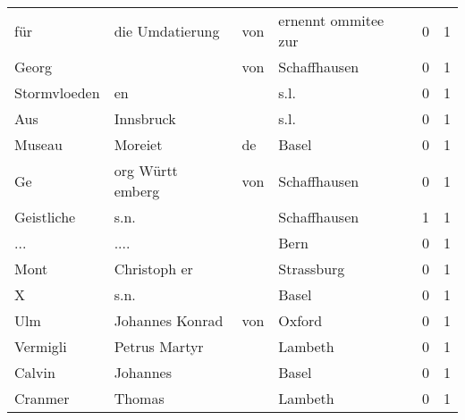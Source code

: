 \begin{center}
\begin{tiny}
\begin{longtabu}{llllrr}
                      für &                    die Umdatierung &         von &                         ernennt ommitee zur &          0 &         1 \\
                    Georg &                                    &         von &                                Schaffhausen &          0 &         1 \\
             Stormvloeden &                                 en &             &                                        s.l. &          0 &         1 \\
                      Aus &                          Innsbruck &             &                                        s.l. &          0 &         1 \\
                   Museau &                            Moreiet &          de &                                       Basel &          0 &         1 \\
                       Ge &                  org  Württ emberg &         von &                                Schaffhausen &          0 &         1 \\
               Geistliche &                               s.n. &             &                                Schaffhausen &          1 &         1 \\
                      ... &                               .... &             &                                        Bern &          0 &         1 \\
                     Mont &                       Christoph er &             &                                  Strassburg &          0 &         1 \\
                        X &                               s.n. &             &                                       Basel &          0 &         1 \\
                      Ulm &                    Johannes Konrad &         von &                                      Oxford &          0 &         1 \\
                 Vermigli &                      Petrus Martyr &             &                                     Lambeth &          0 &         1 \\
                   Calvin &                           Johannes &             &                                       Basel &          0 &         1 \\
                  Cranmer &                             Thomas &             &                                     Lambeth &          0 &         1 \\

\end{longtabu}
\end{tiny}
\end{center}
